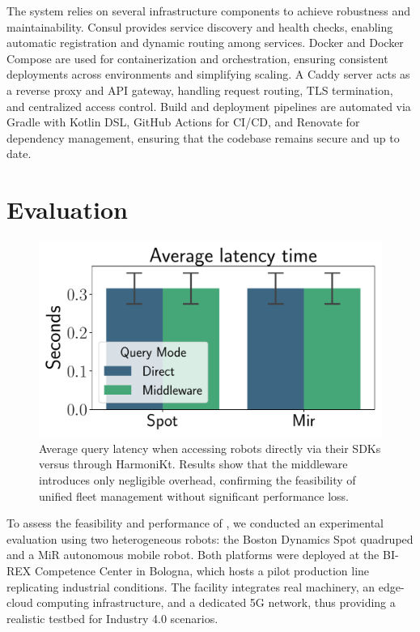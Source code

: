 \documentclass[conference]{IEEEtran}
\begin{document}
The system relies on several infrastructure components to achieve robustness and maintainability. 
%
Consul provides service discovery and health checks, 
 enabling automatic registration and dynamic routing among services. 
% 
Docker and Docker Compose are used for containerization and orchestration, 
 ensuring consistent deployments across environments and simplifying scaling. 
% 
A Caddy server acts as a reverse proxy and API gateway, 
 handling request routing, TLS termination, and centralized access control. 
% 
Build and deployment pipelines are automated via Gradle with Kotlin DSL, GitHub Actions for CI/CD, 
 and Renovate for dependency management, ensuring that the codebase remains secure and up to date.


\section{Evaluation}\label{sec:eval}

\begin{figure}[htb]
    \centering
    \includegraphics[width=0.6\columnwidth]{images/latency.pdf}
    \caption{
        Average query latency when accessing robots directly via their SDKs versus through HarmoniKt. 
        Results show that the middleware introduces only negligible overhead, 
        confirming the feasibility of unified fleet management without significant performance loss.
    }
    \label{fig:latency}
\end{figure}

To assess the feasibility and performance of \approach{}, 
 we conducted an experimental evaluation using two heterogeneous robots: 
 the Boston Dynamics Spot quadruped and a MiR autonomous mobile robot. 
% 
Both platforms were deployed at the BI-REX Competence Center in Bologna, 
 which hosts a pilot production line replicating industrial conditions. 
% 
The facility integrates real machinery, an edge-cloud computing infrastructure, 
 and a dedicated 5G network, thus providing a realistic testbed for Industry 4.0 scenarios.
\end{document}
